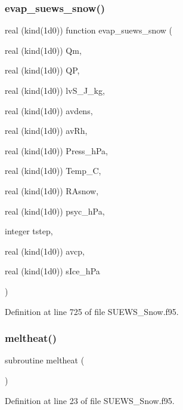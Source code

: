 \subsubsection{\texorpdfstring{evap\+\_\+suews\+\_\+snow()}{evap\_suews\_snow()}}
{\footnotesize\ttfamily real (kind(1d0)) function evap\+\_\+suews\+\_\+snow (\begin{DoxyParamCaption}\item[{real (kind(1d0))}]{Qm,  }\item[{real (kind(1d0))}]{QP,  }\item[{real (kind(1d0))}]{lv\+S\+\_\+\+J\+\_\+kg,  }\item[{real (kind(1d0))}]{avdens,  }\item[{real (kind(1d0))}]{av\+Rh,  }\item[{real (kind(1d0))}]{Press\+\_\+h\+Pa,  }\item[{real (kind(1d0))}]{Temp\+\_\+C,  }\item[{real (kind(1d0))}]{R\+Asnow,  }\item[{real (kind(1d0))}]{psyc\+\_\+h\+Pa,  }\item[{integer}]{tstep,  }\item[{real (kind(1d0))}]{avcp,  }\item[{real (kind(1d0))}]{s\+Ice\+\_\+h\+Pa }\end{DoxyParamCaption})}



Definition at line 725 of file S\+U\+E\+W\+S\+\_\+\+Snow.\+f95.

\mbox{\label{_s_u_e_w_s___snow_8f95_ab4ce449365f2ed93c920c5629a3ca469}} 
\subsubsection{\texorpdfstring{meltheat()}{meltheat()}}
{\footnotesize\ttfamily subroutine meltheat (\begin{DoxyParamCaption}{ }\end{DoxyParamCaption})}



Definition at line 23 of file S\+U\+E\+W\+S\+\_\+\+Snow.\+f95.

\mbox{\label{_s_u_e_w_s___snow_8f95_a2035fba82c9957964a34a3e537c5de1e}} 
